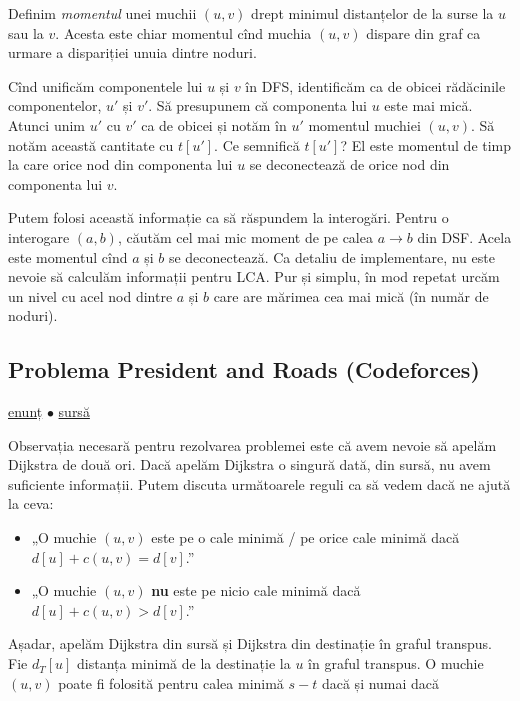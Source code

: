 \documentclass[../main.tex]{subfiles}
\begin{document}
Definim \textit{momentul} unei muchii $(u,v)$ drept minimul distanțelor de la surse la $u$ sau la $v$. Acesta este chiar momentul cînd muchia $(u,v)$ dispare din graf ca urmare a dispariției unuia dintre noduri.

Cînd unificăm componentele lui $u$ și $v$ în DFS, identificăm ca de obicei rădăcinile componentelor, $u'$ și $v'$. Să presupunem că componenta lui $u$ este mai mică. Atunci unim $u'$ cu $v'$ ca de obicei și notăm în $u'$ momentul muchiei $(u,v)$. Să notăm această cantitate cu $t[u']$. Ce semnifică $t[u']$? El este momentul de timp la care orice nod din componenta lui $u$ se deconectează de orice nod din componenta lui $v$.

Putem folosi această informație ca să răspundem la interogări. Pentru o interogare $(a, b)$, căutăm cel mai mic moment de pe calea $a \to b$ din DSF. Acela este momentul cînd $a$ și $b$ se deconectează. Ca detaliu de implementare, nu este nevoie să calculăm informații pentru LCA. Pur și simplu, în mod repetat urcăm un nivel cu acel nod dintre $a$ și $b$ care are mărimea cea mai mică (în număr de noduri).


\subsection{Problema President and Roads (Codeforces)}
\label{problem:president-and-roads}

\href{https://codeforces.com/contest/567/problem/E}{enunț}
$\bullet$
\hyperref[code:president-and-roads]{sursă}

Observația necesară pentru rezolvarea problemei este că avem nevoie să apelăm Dijkstra de două ori. Dacă apelăm Dijkstra o singură dată, din sursă, nu avem suficiente informații. Putem discuta următoarele reguli ca să vedem dacă ne ajută la ceva:

\begin{itemize}
  \item „O muchie $(u, v)$ este pe o cale minimă / pe orice cale minimă dacă $d[u] + c(u,v) = d[v]$.”
  \item „O muchie $(u, v)$ \textbf{nu} este pe nicio cale minimă dacă $d[u] + c(u,v) > d[v]$.”
\end{itemize}

Așadar, apelăm Dijkstra din sursă și Dijkstra din destinație în graful transpus. Fie $d_T[u]$ distanța minimă de la destinație la $u$ în graful transpus. O muchie $(u,v)$ poate fi folosită pentru calea minimă $s-t$ dacă și numai dacă
\end{document}
